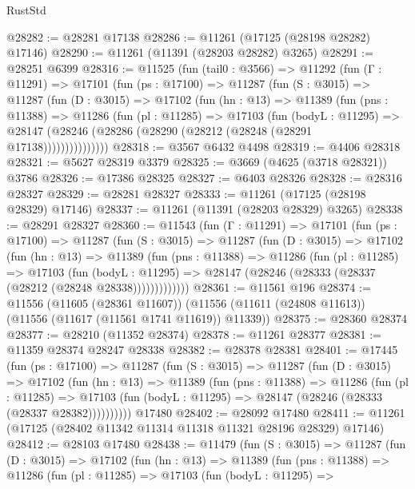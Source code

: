 \begin{lexlean}{RustStd}
\begin{coremodule}
@28282 := @28281 @17138
@28286 := @11261 (@17125 (@28198 @28282) @17146)
@28290 := @11261 (@11391 (@28203 @28282) @3265)
@28291 := @28251 @6399
@28316 := @11525
    (fun (tail0 : @3566) =>
    @11292
      (fun (Γ : @11291) =>
      @17101
        (fun (ps : @17100) =>
        @11287
          (fun (S : @3015) =>
          @11287
            (fun (D : @3015) =>
            @17102
              (fun (hn : @13) =>
              @11389
                (fun (pns : @11388) =>
                @11286
                  (fun (pl : @11285) =>
                  @17103
                    (fun (bodyL : @11295) =>
                    @28147 (@28246 (@28286 (@28290 (@28212 (@28248 (@28291 @17138)))))))))))))))
@28318 := @3567 @6432 @4498
@28319 := @4406 @28318
@28321 := @5627 @28319 @3379
@28325 := @3669 (@4625 (@3718 @28321)) @3786
@28326 := @17386 @28325
@28327 := @6403 @28326
@28328 := @28316 @28327
@28329 := @28281 @28327
@28333 := @11261 (@17125 (@28198 @28329) @17146)
@28337 := @11261 (@11391 (@28203 @28329) @3265)
@28338 := @28291 @28327
@28360 := @11543
    (fun (Γ : @11291) =>
    @17101
      (fun (ps : @17100) =>
      @11287
        (fun (S : @3015) =>
        @11287
          (fun (D : @3015) =>
          @17102
            (fun (hn : @13) =>
            @11389
              (fun (pns : @11388) =>
              @11286
                (fun (pl : @11285) =>
                @17103
                  (fun (bodyL : @11295) =>
                  @28147 (@28246 (@28333 (@28337 (@28212 (@28248 @28338)))))))))))))
@28361 := @11561 @196
@28374 := @11556
    (@11605 (@28361 @11607))
    (@11556 (@11611 (@24808 @11613)) (@11556 (@11617 (@11561 @1741 @11619)) @11339))
@28375 := @28360 @28374
@28377 := @28210 (@11352 @28374)
@28378 := @11261 @28377
@28381 := @11359 @28374 @28247 @28338
@28382 := @28378 @28381
@28401 := @17445
    (fun (ps : @17100) =>
    @11287
      (fun (S : @3015) =>
      @11287
        (fun (D : @3015) =>
        @17102
          (fun (hn : @13) =>
          @11389
            (fun (pns : @11388) =>
            @11286
              (fun (pl : @11285) =>
              @17103 (fun (bodyL : @11295) => @28147 (@28246 (@28333 (@28337 @28382))))))))))
    @17480
@28402 := @28092 @17480
@28411 := @11261 (@17125 (@28402 @11342 @11314 @11318 @11321 @28196 @28329) @17146)
@28412 := @28103 @17480
@28438 := @11479
    (fun (S : @3015) =>
    @11287
      (fun (D : @3015) =>
      @17102
        (fun (hn : @13) =>
        @11389
          (fun (pns : @11388) =>
          @11286
            (fun (pl : @11285) =>
            @17103
              (fun (bodyL : @11295) =>

\end{coremodule}
\end{lexlean}
